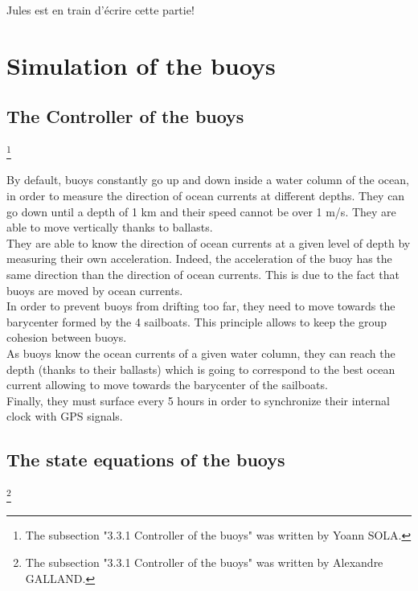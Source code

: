 \documentclass[a4paper]{report}
\begin{document}
Jules est en train d'écrire cette partie!

\section{Simulation of the buoys}
\subsection{The Controller of the buoys}

\footnote{The subsection "3.3.1 Controller of the buoys" was written by Yoann SOLA.}

By default, buoys constantly go up and down inside a water column of the ocean, in order to measure the direction of ocean currents at different depths. They can go down until a depth of 1 km and their speed cannot be over 1 m/s. They are able to move vertically thanks to ballasts.\\

They are able to know the direction of ocean currents at a given level of depth by measuring their own acceleration. Indeed, the acceleration of the buoy has the same direction than the direction of ocean currents. This is due to the fact that buoys are moved by ocean currents.\\

In order to prevent buoys from drifting too far, they need to move towards the barycenter formed by the 4 sailboats. This principle allows to keep the group cohesion between buoys.\\

As buoys know the ocean currents of a given water column, they can reach the depth (thanks to their ballasts) which is going to correspond to the best ocean current allowing to move towards the barycenter of the sailboats.\\

Finally, they must surface every 5 hours in order to synchronize their internal clock with GPS signals.





\subsection{The state equations of the buoys}

\footnote{The subsection "3.3.1 Controller of the buoys" was written by Alexandre GALLAND.}
\end{document}
